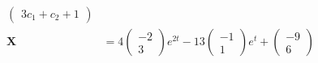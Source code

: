 \documentclass{article}
\begin{document}
\begin{align*}
\begin{pmatrix}
                      3 c_1 + c_2 + 1
                    \end{pmatrix}                                                     \\
  \mathbf{X}      & = 4 \begin{pmatrix}
                          -2 \\
                          3
                        \end{pmatrix} e^{2 t} - 13 \begin{pmatrix}
                                                     -1 \\
                                                     1
                                                   \end{pmatrix} e^t + \begin{pmatrix}
                                                                         -9 \\
                                                                         6
                                                                       \end{pmatrix}    \\
\end{align*}

\setcounter{subsubsection}{10}
\subsubsection{}
\end{document}
